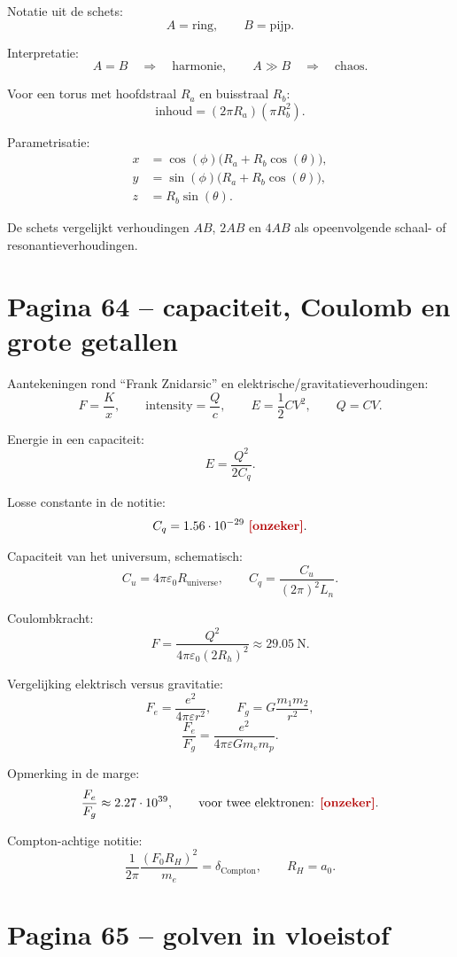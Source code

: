 \documentclass[11pt,a4paper]{article}
\newcommand{\onzeker}[1]{\ifmmode\text{\color{red!70!black}\bfseries[onzeker]}\else\textcolor{red!70!black}{\textbf{[onzeker:} #1\textbf{]}}\fi}
\begin{document}
Notatie uit de schets:
$$
A=\text{ring},
\qquad
B=\text{pijp}.
$$

Interpretatie:
$$
A=B
\quad\Rightarrow\quad
\text{harmonie},
\qquad
A\gg B
\quad\Rightarrow\quad
\text{chaos}.
$$

Voor een torus met hoofdstraal $R_a$ en buisstraal $R_b$:
$$
\text{inhoud}
=
(2\pi R_a)(\pi R_b^2).
$$

Parametrisatie:
\begin{align*}
x&=\cos(\phi)\bigl(R_a+R_b\cos(\theta)\bigr),\\
y&=\sin(\phi)\bigl(R_a+R_b\cos(\theta)\bigr),\\
z&=R_b\sin(\theta).
\end{align*}

De schets vergelijkt verhoudingen $AB$, $2AB$ en $4AB$ als opeenvolgende schaal- of resonantieverhoudingen.

\section*{Pagina 64 -- capaciteit, Coulomb en grote getallen}

Aantekeningen rond ``Frank Znidarsic'' en elektrische/gravitatieverhoudingen:
$$
F=\frac{K}{x},
\qquad
\text{intensity}=\frac{Q}{c},
\qquad
E=\frac{1}{2}CV^{2},
\qquad
Q=CV.
$$

Energie in een capaciteit:
$$
E=\frac{Q^{2}}{2C_q}.
$$

Losse constante in de notitie:
$$
C_q=1.56\cdot10^{-29}\ \onzeker{\mathrm{F}}.
$$

Capaciteit van het universum, schematisch:
$$
C_u=4\pi\varepsilon_0 R_{\mathrm{universe}},
\qquad
C_q=\frac{C_u}{(2\pi)^2L_n}.
$$

Coulombkracht:
$$
F=
\frac{Q^{2}}{4\pi\varepsilon_0(2R_h)^2}
\approx
29.05\ \mathrm{N}.
$$

Vergelijking elektrisch versus gravitatie:
$$
F_e=\frac{e^{2}}{4\pi\varepsilon r^{2}},
\qquad
F_g=G\frac{m_1m_2}{r^{2}},
$$
$$
\frac{F_e}{F_g}
=
\frac{e^{2}}{4\pi\varepsilon Gm_em_p}.
$$

Opmerking in de marge:
$$
\frac{F_e}{F_g}
\approx
2.27\cdot10^{39},
\qquad
\text{voor twee elektronen: }\onzeker{4.2\cdot10^{42}}.
$$

Compton-achtige notitie:
$$
\frac{1}{2\pi}
\frac{(F_0R_H)^2}{m_e}
=
\delta_{\mathrm{Compton}},
\qquad
R_H=a_0.
$$

\section*{Pagina 65 -- golven in vloeistof}
\end{document}
